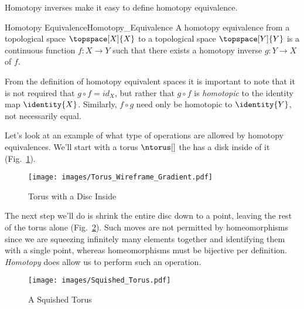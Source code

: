 \documentclass{book}                                                           %
\begin{document}
                Homotopy inverses make it easy to define homotopy equivalence.
                \begin{fdefinition}{Homotopy Equivalence}{Homotopy_Equivalence}
                    A homotopy equivalence from a topological space
                    $\topspace[X]{X}$ to a topological space $\topspace[Y]{Y}$
                    is a continuous function $f:X\rightarrow{Y}$ such that there
                    exists a homotopy inverse $g:Y\rightarrow{X}$ of $f$.
                \end{fdefinition}
                From the definition of homotopy equivalent spaces it is
                important to note that it is not required that
                $g\circ{f}=id_{X}$, but rather that $g\circ{f}$ is
                \textit{homotopic} to the identity map $\identity{X}$.
                Similarly, $f\circ{g}$ need only be homotopic to $\identity{Y}$,
                not necessarily equal.
                \par\hfill\par
                Let's look at an example of what type of operations are allowed
                by homotopy equivalences. We'll start with a torus $\ntorus[]$
                the has a disk inside of it
                (Fig.~\ref{fig:Torus_with_Disc_Inside}).
                \begin{figure}[H]
                    \centering
                    \captionsetup{type=figure}
                    \texttt{[image: images/Torus\_Wireframe\_Gradient.pdf]}
                    \caption{Torus with a Disc Inside}
                    \label{fig:Torus_with_Disc_Inside}
                \end{figure}
                The next step we'll do is shrink the entire disc down to a
                point, leaving the rest of the torus alone
                (Fig.~\ref{fig:Squished_Torus}). Such moves are not permitted by
                homeomorphisms since we are squeezing infinitely many elements
                together and identifying them with a single point, whereas
                homeomorphisms must be bijective per definition.
                \textit{Homotopy} does allow us to perform such an operation.
                \begin{figure}[H]
                    \centering
                    \captionsetup{type=figure}
                    \texttt{[image: images/Squished\_Torus.pdf]}
                    \caption{A Squished Torus}
                    \label{fig:Squished_Torus}
                \end{figure}
\end{document}
